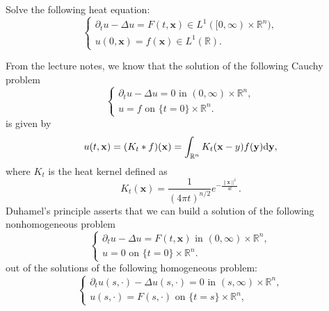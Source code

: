 \begin{pro}
  Solve the following heat equation:
  \begin{equation}
    \label{eq:1}
    \begin{cases}
    \partial_t u - \Delta u = F(t, \mathbf{x})
    \in L^1([0, \infty)\times\mathbb{R}^n), \\
    u(0, \mathbf{x}) = f(\mathbf{x}) \in L^1(\mathbb{R}).
  \end{cases}
  \end{equation}
\end{pro}

\begin{sol}
  From the lecture notes,
  we know that the solution of the
  following Cauchy problem
  \begin{equation}
    \label{eq:2}
    \begin{cases}
    \partial_tu - \Delta u = 0 \text{ in } (0, \infty)\times\mathbb{R}^n,\\
    u = f \text{ on } \{t=0\}\times\mathbb{R}^n.
  \end{cases}
\end{equation}
  is given by
  \begin{equation}
    \label{eq:3}
    u(t, \mathbf{x}) = (K_t * f)(\mathbf{x})
    = \int_{\mathbb{R}^n}K_t(\mathbf{x}-y)f(\mathbf{y})\mathrm{d} \mathbf{y},
  \end{equation}
  where $K_t$ is the heat kernel defined as
  \begin{displaymath}
    K_t(\mathbf{x}) = \frac{1}{(4\pi t)^{n/2}}
    e^{-\frac{\|\mathbf{x}\|^2}{4t}}.
  \end{displaymath}
  Duhamel's principle asserts that
  we can build a solution of the following
  nonhomogeneous problem
  \begin{equation}
    \label{eq:4}
    \begin{cases}
      \partial_t u-\Delta u = F(t, \mathbf{x}) \text{ in }
      (0, \infty)\times\mathbb{R}^n, \\
      u = 0 \text{ on } \{t=0\}\times\mathbb{R}^n.
    \end{cases}
  \end{equation}
  out of the solutions of the following homogeneous
  problem:
  \begin{equation}
    \label{eq:5}
    \begin{cases}
      \partial_t u(s, \cdot) - \Delta u(s, \cdot) = 0
      \text{ in } (s, \infty)\times\mathbb{R}^n,\\
    u(s, \cdot) = F(s, \cdot) \text{ on } \{t=s\}\times\mathbb{R}^n,

\end{cases}
\end{equation}
\end{sol}
